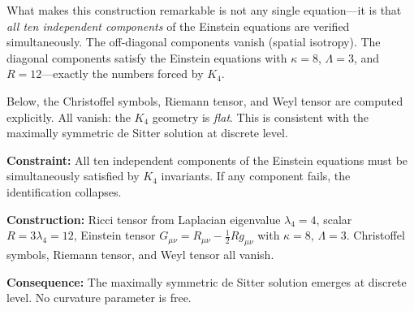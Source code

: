 \documentclass[11pt,a4paper]{book}
\begin{document}
What makes this construction remarkable is not any single equation---it is that \emph{all ten independent components} of the Einstein equations are verified simultaneously. The off-diagonal components vanish (spatial isotropy). The diagonal components satisfy the Einstein equations with $\kappa = 8$, $\Lambda = 3$, and $R = 12$---exactly the numbers forced by $K_4$.

Below, the Christoffel symbols, Riemann tensor, and Weyl tensor are computed explicitly. All vanish: the $K_4$ geometry is \emph{flat}. This is consistent with the maximally symmetric de Sitter solution at discrete level.

\textbf{Constraint:} All ten independent components of the Einstein equations must be simultaneously satisfied by $K_4$ invariants. If any component fails, the identification collapses.

\textbf{Construction:} Ricci tensor from Laplacian eigenvalue $\lambda_4 = 4$, scalar $R = 3\lambda_4 = 12$, Einstein tensor $G_{\mu\nu} = R_{\mu\nu} - \tfrac{1}{2}Rg_{\mu\nu}$ with $\kappa = 8$, $\Lambda = 3$. Christoffel symbols, Riemann tensor, and Weyl tensor all vanish.

\textbf{Consequence:} The maximally symmetric de Sitter solution emerges at discrete level. No curvature parameter is free.
\end{document}
